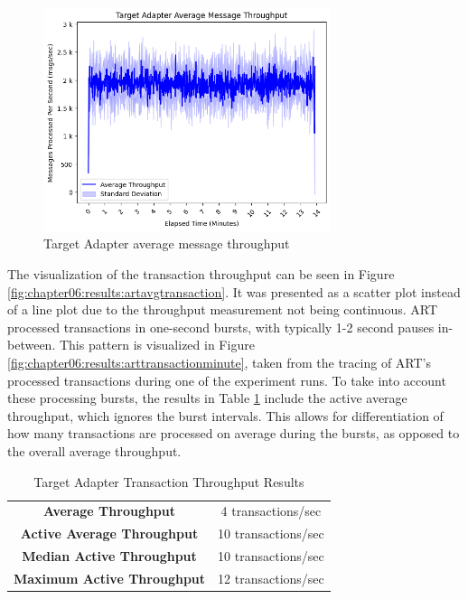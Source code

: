 \begin{figure}[htbp]
    \centering
    \includegraphics[width=0.75\textwidth]{chapters/images/art-performance/art-avg-message-throughput.png}
    \caption{Target Adapter average message throughput}
    \label{fig:chapter06:results:artavgmessage}
\end{figure}

The visualization of the transaction throughput can be seen in Figure \ref{fig:chapter06:results:artavgtransaction}. It was presented as a scatter plot instead of a line plot due to the throughput measurement not being continuous. \ac{ART} processed transactions in one-second bursts, with typically 1-2 second pauses in-between. This pattern is visualized in Figure \ref{fig:chapter06:results:arttransactionminute}, taken from the tracing of \ac{ART}'s processed transactions during one of the experiment runs. To take into account these processing bursts, the results in Table \ref{tab:art:transactionthroughput} include the active average throughput, which ignores the burst intervals. This allows for differentiation of how many transactions are processed on average during the bursts, as opposed to the overall average throughput.

\begin{table}
    \centering
    \begin{tabular}{|cc|}
        \hline
         \textbf{Average Throughput} & 4 transactions/sec \\
         \textbf{Active Average Throughput} & 10 transactions/sec \\
         \textbf{Median Active Throughput} & 10 transactions/sec \\
         \textbf{Maximum Active Throughput} & 12 transactions/sec \\
        \hline
    \end{tabular}
    \caption{Target Adapter Transaction Throughput Results}
    \label{tab:art:transactionthroughput}
\end{table}

